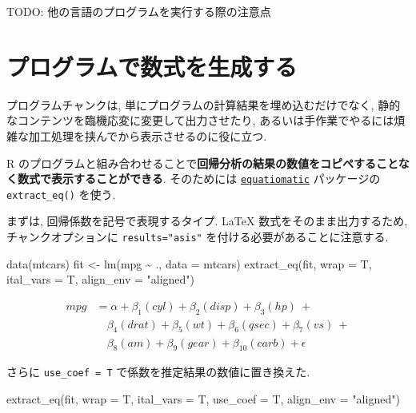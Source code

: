 \documentclass[
]{bxjsbook}
\newenvironment{Shaded}{\begin{snugshade}}{\end{snugshade}}
\newcommand{\AttributeTok}[1]{\textcolor[rgb]{0.77,0.63,0.00}{#1}}
\newcommand{\FunctionTok}[1]{\textcolor[rgb]{0.00,0.00,0.00}{#1}}
\newcommand{\NormalTok}[1]{#1}
\newcommand{\OtherTok}[1]{\textcolor[rgb]{0.56,0.35,0.01}{#1}}
\newcommand{\SpecialCharTok}[1]{\textcolor[rgb]{0.00,0.00,0.00}{#1}}
\newcommand{\StringTok}[1]{\textcolor[rgb]{0.31,0.60,0.02}{#1}}
\theoremstyle{definition}
\theoremstyle{definition}
\theoremstyle{definition}
\theoremstyle{remark}
\begin{document}
TODO: 他の言語のプログラムを実行する際の注意点

\hypertarget{ux30d7ux30edux30b0ux30e9ux30e0ux3067ux6570ux5f0fux3092ux751fux6210ux3059ux308b}{%
\section{プログラムで数式を生成する}\label{ux30d7ux30edux30b0ux30e9ux30e0ux3067ux6570ux5f0fux3092ux751fux6210ux3059ux308b}}

プログラムチャンクは, 単にプログラムの計算結果を埋め込むだけでなく,
静的なコンテンツを臨機応変に変更して出力させたり,
あるいは手作業でやるには煩雑な加工処理を挟んでから表示させるのに役に立つ.

R
のプログラムと組み合わせることで\textbf{回帰分析の結果の数値をコピペすることなく数式で表示することができる}.
そのためには
\href{https://github.com/datalorax/equatiomatic}{\texttt{equatiomatic}}
パッケージの \texttt{extract\_eq()} を使う.

まずは, 回帰係数を記号で表現するタイプ. LaTeX
数式をそのまま出力するため, チャンクオプションに \texttt{results="asis"}
を付ける必要があることに注意する.

\begin{Shaded}
\begin{Highlighting}[numbers=left,,]
\FunctionTok{data}\NormalTok{(mtcars)}
\NormalTok{fit }\OtherTok{\textless{}{-}} \FunctionTok{lm}\NormalTok{(mpg }\SpecialCharTok{\textasciitilde{}}\NormalTok{ ., }\AttributeTok{data =}\NormalTok{ mtcars)}
\FunctionTok{extract\_eq}\NormalTok{(fit, }\AttributeTok{wrap =}\NormalTok{ T, }\AttributeTok{ital\_vars =}\NormalTok{ T, }\AttributeTok{align\_env =} \StringTok{"aligned"}\NormalTok{)}
\end{Highlighting}
\end{Shaded}

\[
\begin{aligned}
mpg &= \alpha + \beta_{1}(cyl) + \beta_{2}(disp) + \beta_{3}(hp)\ + \\
&\quad \beta_{4}(drat) + \beta_{5}(wt) + \beta_{6}(qsec) + \beta_{7}(vs)\ + \\
&\quad \beta_{8}(am) + \beta_{9}(gear) + \beta_{10}(carb) + \epsilon
\end{aligned}
\]

さらに \texttt{use\_coef\ =\ T} で係数を推定結果の数値に置き換えた.

\begin{Shaded}
\begin{Highlighting}[numbers=left,,]
\FunctionTok{extract\_eq}\NormalTok{(fit, }\AttributeTok{wrap =}\NormalTok{ T, }\AttributeTok{ital\_vars =}\NormalTok{ T, }\AttributeTok{use\_coef =}\NormalTok{ T, }\AttributeTok{align\_env =} \StringTok{"aligned"}\NormalTok{)}
\end{Highlighting}
\end{Shaded}
\end{document}
